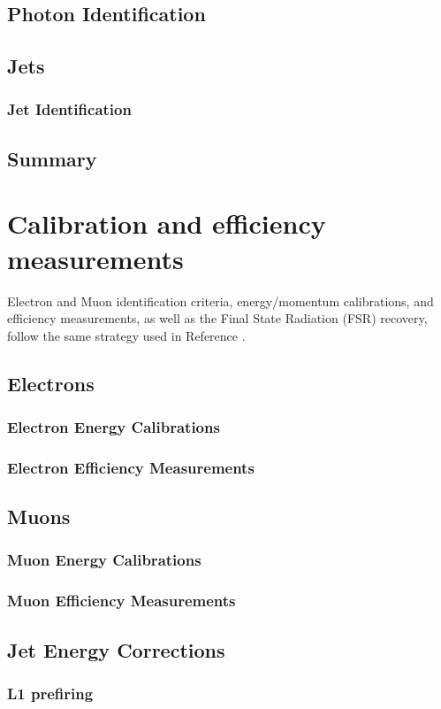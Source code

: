 \subsection{Photon Identification}
\label{sec:photonID}


\subsection{Jets}
\subsubsection{Jet Identification}


\subsection{Summary}


\section{Calibration and efficiency measurements}
Electron and Muon identification criteria, energy/momentum calibrations, and efficiency measurements,
as well as the Final State Radiation (FSR) recovery, follow the same strategy used in Reference \cite{CMS-SMP-20-001}. %

\subsection{Electrons}
\subsubsection{Electron Energy Calibrations}

\subsubsection{Electron Efficiency Measurements}
\label{sec:eleEffMeas}


\subsection{Muons}
\subsubsection{Muon Energy Calibrations}

\subsubsection{Muon Efficiency Measurements}
\label{sec:muonEffMeas}


\subsection{Jet Energy Corrections}


\subsubsection{L1 prefiring}

